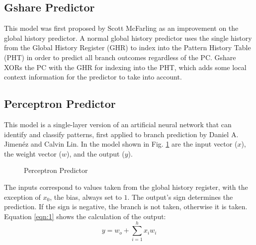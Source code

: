 \documentclass[conference]{IEEEtran}
\begin{document}
\subsection{Gshare Predictor} \label{ssec:gshare}
This model was first proposed by Scott McFarling as an improvement on the global history predictor\cite{mcfarling1993}. A normal global history predictor uses the single history from the Global History Register (GHR) to index into the Pattern History Table (PHT) in order to predict all branch outcomes regardless of the PC. Gshare XORs the PC with the GHR for indexing into the PHT, which adds some local context information for the predictor to take into account.

\subsection{Perceptron Predictor} \label{ssec:perceptron}
This model is a single-layer version of an artificial neural network that can identify and classify patterns, first applied to branch prediction by Daniel A. Jimen\'ez and Calvin Lin\cite{jimenez2001dynamic}. In the model shown in Fig. \ref{fig:perceptron} are the input vector ($x$), the weight vector ($w$), and the output ($y$).
\begin{figure}
    \centering
    \caption{Perceptron Predictor}
	\label{fig:perceptron}
\end{figure}
The inputs correspond to values taken from the global history register, with the exception of $x_0$, the bias, always set to $1$. The output's sign determines the prediction. If the sign is negative, the branch is not taken, otherwise it is taken. Equation \eqref{eqn:1} shows the calculation of the output:
\begin{equation}
    y = w_o + \sum_{i=1}^{h}{x_iw_i}
    \label{eqn:1}
\end{equation}
\end{document}
